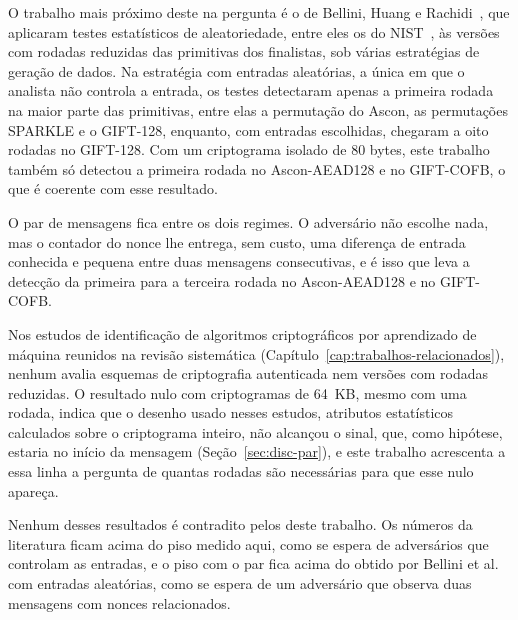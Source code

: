 O trabalho mais próximo deste na pergunta é o de Bellini, Huang e Rachidi~\cite{BelliniHuang2022}, que aplicaram testes estatísticos de aleatoriedade, entre eles os do NIST~\cite{Rukhin2010NIST80022}, às versões com rodadas reduzidas das primitivas dos finalistas, sob várias estratégias de geração de dados. Na estratégia com entradas aleatórias, a única em que o analista não controla a entrada, os testes detectaram apenas a primeira rodada na maior parte das primitivas, entre elas a permutação do Ascon, as permutações SPARKLE e o GIFT-128, enquanto, com entradas escolhidas, chegaram a oito rodadas no GIFT-128. Com um criptograma isolado de 80 bytes, este trabalho também só detectou a primeira rodada no Ascon-AEAD128 e no GIFT-COFB, o que é coerente com esse resultado.

O par de mensagens fica entre os dois regimes. O adversário não escolhe nada, mas o contador do nonce lhe entrega, sem custo, uma diferença de entrada conhecida e pequena entre duas mensagens consecutivas, e é isso que leva a detecção da primeira para a terceira rodada no Ascon-AEAD128 e no GIFT-COFB.

Nos estudos de identificação de algoritmos criptográficos por aprendizado de máquina reunidos na revisão sistemática (Capítulo~\ref{cap:trabalhos-relacionados}), nenhum avalia esquemas de criptografia autenticada nem versões com rodadas reduzidas. O resultado nulo com criptogramas de 64~KB, mesmo com uma rodada, indica que o desenho usado nesses estudos, atributos estatísticos calculados sobre o criptograma inteiro, não alcançou o sinal, que, como hipótese, estaria no início da mensagem (Seção~\ref{sec:disc-par}), e este trabalho acrescenta a essa linha a pergunta de quantas rodadas são necessárias para que esse nulo apareça.

Nenhum desses resultados é contradito pelos deste trabalho. Os números da literatura ficam acima do piso medido aqui, como se espera de adversários que controlam as entradas, e o piso com o par fica acima do obtido por Bellini et al. com entradas aleatórias, como se espera de um adversário que observa duas mensagens com nonces relacionados.

